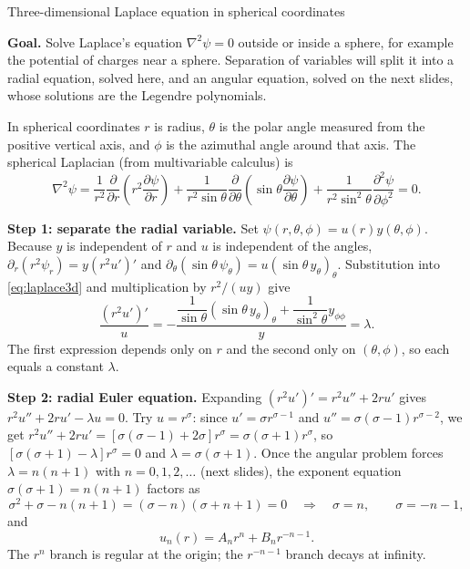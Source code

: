 \documentclass[11pt]{beamer}
\begin{document}
\begin{frame}[allowframebreaks=1.00]{Three-dimensional Laplace equation in spherical coordinates}
\footnotesize

\textbf{Goal.} Solve Laplace's equation $\nabla^2\psi=0$ outside or inside a sphere, for example
the potential of charges near a sphere. Separation of variables will split it into a radial
equation, solved here, and an angular equation, solved on the next slides, whose solutions are
the Legendre polynomials.

In spherical coordinates $r$ is radius, $\theta$ is the polar angle measured from
the positive vertical axis, and $\phi$ is the azimuthal angle around that axis.
The spherical Laplacian (from multivariable calculus) is
\begin{equation}
  \nabla^2\psi
  =
  \frac{1}{r^2}
    \frac{\partial}{\partial r}
      \left(r^2\frac{\partial\psi}{\partial r}\right)
  +\frac{1}{r^2\sin\theta}
    \frac{\partial}{\partial\theta}
      \left(\sin\theta\frac{\partial\psi}{\partial\theta}\right)
  +\frac{1}{r^2\sin^2\theta}
    \frac{\partial^2\psi}{\partial\phi^2}
  =0.
  \label{eq:laplace3d}
\end{equation}

\textbf{Step 1: separate the radial variable.}  Set $\psi(r,\theta,\phi)=u(r)y(\theta,\phi)$.
Because $y$ is independent of $r$ and $u$ is independent of the angles,
$\partial_r(r^2\psi_r)=y(r^2u')'$ and $\partial_\theta(\sin\theta\,\psi_\theta)=u(\sin\theta\,y_\theta)_\theta$.
Substitution into \eqref{eq:laplace3d} and multiplication by $r^2/(uy)$ give
\begin{equation}
  \frac{(r^2u')'}{u}
  =
  -\frac{
      \dfrac{1}{\sin\theta}(\sin\theta\,y_\theta)_\theta
      +\dfrac{1}{\sin^2\theta}y_{\phi\phi}
    }{y}
  =\lambda.
  \label{eq:sep-radial3d}
\end{equation}
The first expression depends only on $r$ and the second only on
$(\theta,\phi)$, so each equals a constant $\lambda$.

\par\framebreak\par
\textbf{Step 2: radial Euler equation.}  Expanding $(r^2u')'=r^2u''+2ru'$ gives
$r^2u''+2ru'-\lambda u=0$. Try $u=r^\sigma$: since $u'=\sigma r^{\sigma-1}$ and
$u''=\sigma(\sigma-1)r^{\sigma-2}$, we get
$r^2u''+2ru'=[\sigma(\sigma-1)+2\sigma]r^\sigma=\sigma(\sigma+1)r^\sigma$, so
$[\sigma(\sigma+1)-\lambda]r^\sigma=0$ and $\lambda=\sigma(\sigma+1)$.  Once the angular problem forces
$\lambda=n(n+1)$ with $n=0,1,2,\ldots$ (next slides), the exponent equation
$\sigma(\sigma+1)=n(n+1)$ factors as
\[
  \sigma^2+\sigma-n(n+1)=(\sigma-n)(\sigma+n+1)=0
  \quad\Longrightarrow\quad
  \sigma=n,\qquad \sigma=-n-1,
\]
and
\begin{equation}
  u_n(r)=A_nr^n+B_nr^{-n-1}.
  \label{eq:spherical-radial-powers}
\end{equation}
The $r^n$ branch is regular at the origin; the $r^{-n-1}$ branch decays at infinity.


\end{frame}
\end{document}

